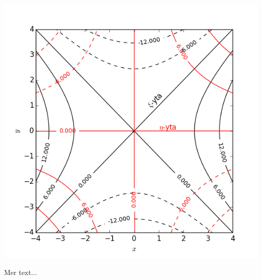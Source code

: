 \documentclass[%
oneside,                 %
final,                   %
10pt]{article}
\newenvironment{notice_mdfboxadmon}[1][]{
\begin{notice_mdfboxmdframed}[frametitle=#1]
}
{
\end{notice_mdfboxmdframed}
}
\begin{document}
\begin{notice_mdfboxadmon}
\vspace{6mm}

\centerline{\includegraphics[width=0.8\linewidth]{fig/koordinatytor.png}}

\vspace{6mm}
\end{notice_mdfboxadmon} %



Mer text...
\end{document}
